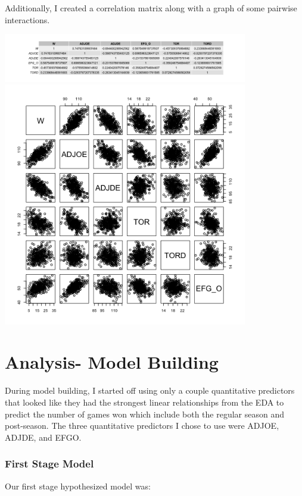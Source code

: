 \documentclass{article}
\begin{document}
Additionally, I created a correlation matrix along with a graph of some pairwise interactions.

\includegraphics[width=0.8\textwidth]{Figures/correlation_matrix.png}\\

\includegraphics[width=0.8\textwidth]{Figures/pairwise_interaction.png}\\


\section{Analysis- Model Building}

During model building, I started off using only a couple quantitative predictors that looked like they had the strongest linear relationships from the EDA to predict the number of games won which include both the regular season and post-season. The three quantitative predictors I chose to use were ADJOE, ADJDE, and EFGO.

\subsubsection*{First Stage Model}

Our first stage hypothesized model was: 
\end{document}
